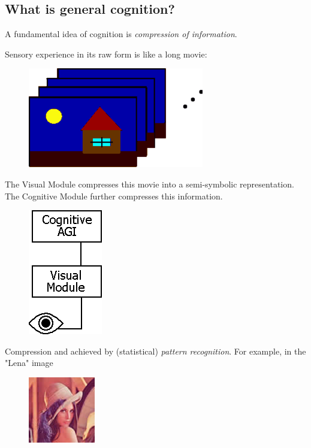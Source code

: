 \subsection{What is  general cognition?}

A fundamental idea of cognition is \emph{compression of information}.

Sensory experience in its raw form is like a long movie:

\begin{figure}[H]
\centering
\includegraphics[scale=0.6]{Movie.png}
\end{figure}

The Visual Module compresses this movie into a semi-symbolic representation. The Cognitive Module further compresses this information. 

\begin{figure}[H]
\centering
\includegraphics[scale=0.7]{GI-Vision.PNG}
\end{figure}

Compression and achieved by (statistical) \emph{pattern recognition}. For example, in the "Lena" image

\begin{figure}[H]
\centering
\includegraphics[scale=0.7]{Lena-Tiny.png}
\end{figure}

